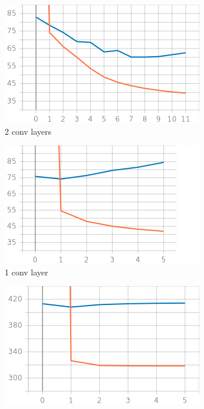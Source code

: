 \begin{figure}
	\centering
	\begin{subfigure}[b]{0.3\linewidth}
		\includegraphics[width=\linewidth]{plots/cnn-training-history-2_conv_layers_deflating_kernel_size_7.png}
		\caption{2 conv layers}
	\end{subfigure}
	\begin{subfigure}[b]{0.3\linewidth}
		\includegraphics[width=\linewidth]{plots/cnn-training-history-1_conv_layers_deflating_kernel_size_7.png}
		\caption{1 conv layer}
	\end{subfigure}
	\begin{subfigure}[b]{0.3\linewidth}
		\includegraphics[width=\linewidth]{plots/cnn-training-history-0_conv_layers_deflating_kernel_size_-1.png}

\end{subfigure}
\end{figure}
